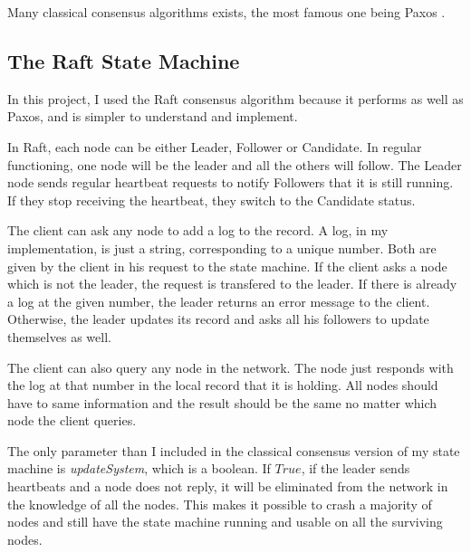 \documentclass[11pt, twocolumn]{article}
\begin{document}
Many classical consensus algorithms exists, the most famous one being Paxos \cite{parliament}. 
\subsection{The Raft State Machine}
In this project, I used the Raft consensus algorithm \cite{understandable} because it performs as well as Paxos, and is simpler to understand and implement.

In Raft, each node can be either Leader, Follower or Candidate. In regular functioning, one node will be the leader and all the others will follow.
The Leader node sends regular heartbeat requests to notify Followers that it is still running. If they stop receiving the heartbeat, they switch to the Candidate status.

The client can ask any node to add a log to the record. A log, in my implementation, is just a string, corresponding to a unique number. Both are given by the client in his request to the state machine.
If the client asks a node which is not the leader, the request is transfered to the leader. If there is already a log at the given number,
the leader returns an error message to the client. Otherwise, the leader updates its record and asks all his followers to update themselves as well.

The client can also query any node in the network. The node just responds with the log at that number in the local record that it is holding. All nodes should have to same information and the result should be the same no matter which node the client queries.

The only parameter than I included in the classical consensus version of my state machine is \emph{updateSystem}, which is a boolean. If $True$, if the leader sends heartbeats and a node does not reply, 
it will be eliminated from the network in the knowledge of all the nodes. This makes it possible to
crash a majority of nodes and still have the state machine running and usable on all the surviving nodes. 


\end{document}
